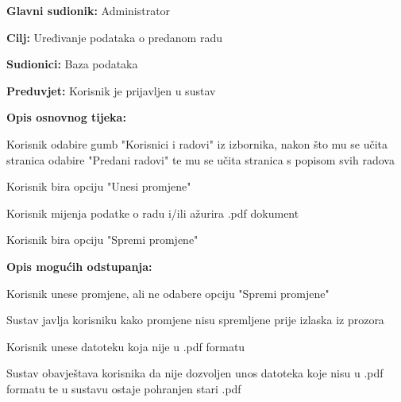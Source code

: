 					\noindent {}
					\begin{packed_item}
						\item \textbf{Glavni sudionik:} Administrator
						\item \textbf{Cilj:} Uređivanje podataka o predanom radu
						\item \textbf{Sudionici:} Baza podataka
						\item \textbf{Preduvjet:} Korisnik je prijavljen u sustav
						
						\item \textbf{Opis osnovnog tijeka:} 
						\item[] \begin{packed_enum}
							\item Korisnik odabire gumb "Korisnici i radovi" iz izbornika, nakon što mu se učita stranica odabire "Predani radovi" te mu se učita stranica s popisom svih radova
							\item Korisnik bira opciju "Unesi promjene"
							\item Korisnik mijenja podatke o radu i/ili ažurira .pdf dokument
							\item Korisnik bira opciju "Spremi promjene"
						\end{packed_enum}
					
						\item \textbf{Opis mogućih odstupanja:}
						\item[] \begin{packed_enum}

							\item[3.a] Korisnik unese promjene, ali ne odabere opciju "Spremi promjene"
							\item[] \begin{packed_enum}
								\item[1.] Sustav javlja korisniku kako promjene nisu spremljene prije izlaska iz prozora
							\end{packed_enum}
							\item[3.b] Korisnik unese datoteku koja nije u .pdf formatu
							\item[] \begin{packed_enum}
								\item[1.] Sustav obavještava korisnika da nije dozvoljen unos datoteka koje nisu u .pdf formatu te u sustavu ostaje pohranjen stari .pdf
							\end{packed_enum}
						\end{packed_enum}
					\end{packed_item}
					
